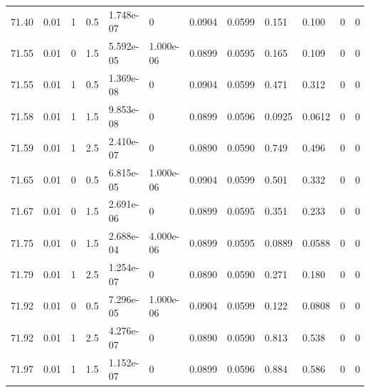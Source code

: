 \documentclass[preview]{standalone}
\begin{document}
{{{{{{{{{{{{{{\begin{tabular}{L{1.2cm}C{1.2cm} C{0.3cm}C{0.5cm} C{1.4cm}C{1.4cm} C{1.4cm}C{1.4cm} C{1.6cm}C{1.6cm} C{1.6cm}C{1.6cm}}
  71.40  &  0.01  & 1     & 0.5 &  1.748e-07  & 0  &  0.0904&   0.0599& 0.151 & 0.100   &  0 & 0  \\ 
  71.55  &  0.01  & 0     & 1.5 &  5.592e-05  & 1.000e-06  &  0.0899&   0.0595& 0.165 & 0.109   &  0 & 0  \\ 
  71.55  &  0.01  & 1     & 0.5 &  1.369e-08  & 0  &  0.0904&   0.0599& 0.471 & 0.312   &  0 & 0  \\ 
  71.58  &  0.01  & 1     & 1.5 &  9.853e-08  & 0  &  0.0899&   0.0596& 0.0925 & 0.0612   &  0 & 0  \\ 
  71.59  &  0.01  & 1     & 2.5 &  2.410e-07  & 0  &  0.0890&   0.0590& 0.749 & 0.496   &  0 & 0  \\ 
  71.65  &  0.01  & 0     & 0.5 &  6.815e-05  & 1.000e-06  &  0.0904&   0.0599& 0.501 & 0.332   &  0 & 0  \\ 
  71.67  &  0.01  & 0     & 1.5 &  2.691e-06  & 0  &  0.0899&   0.0595& 0.351 & 0.233   &  0 & 0  \\ 
  71.75  &  0.01  & 0     & 1.5 &  2.688e-04  & 4.000e-06  &  0.0899&   0.0595& 0.0889 & 0.0588   &  0 & 0  \\ 
  71.79  &  0.01  & 1     & 2.5 &  1.254e-07  & 0  &  0.0890&   0.0590& 0.271 & 0.180   &  0 & 0  \\ 
  71.92  &  0.01  & 0     & 0.5 &  7.296e-05  & 1.000e-06  &  0.0904&   0.0599& 0.122 & 0.0808   &  0 & 0  \\ 
  71.92  &  0.01  & 1     & 2.5 &  4.276e-07  & 0  &  0.0890&   0.0590& 0.813 & 0.538   &  0 & 0  \\ 
  71.97  &  0.01  & 1     & 1.5 &  1.152e-07  & 0  &  0.0899&   0.0596& 0.884 & 0.586   &  0 & 0  \\ 
\hline 
\end{tabular} 

}}}}}}}}}}}}}}
\end{document}
